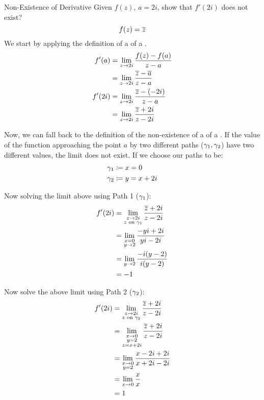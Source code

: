 \begin{example}[Lecture 5]{Non-Existence of Derivative}
  Given $f(z)$, $a = 2i$, show that $f'(2i)$ does not exist?
  \begin{equation*}
    f(z) = \overline{z}
  \end{equation*}
  \tcblower{}
  We start by applying the definition of a  of a .
  \begin{align*}
    f'(a) &= \lim\limits_{z \to 2i} \frac{f(z) - f(a)}{z - a} \\
          &= \lim\limits_{z \to 2i} \frac{\overline{z} - \overline{a}}{z - a} \\
    f'(2i) &= \lim\limits_{z \to 2i} \frac{\overline{z} - (-2i)}{z - a} \\
          &= \lim\limits_{z \to 2i} \frac{\overline{z} + 2i}{z - 2i} \\
  \end{align*}

  Now, we can fall back to the definition of the non-existence of a  of a .
  If the value of the function approaching the point $a$ by two different paths ($\gamma_{1}, \gamma_{2}$) have two different values, the limit does not exist.
  If we choose our paths to be:
  \begin{align*}
    \gamma_{1} &\coloneqq x = 0 \\
    \gamma_{2} &\coloneqq y = x + 2i
  \end{align*}

  Now solving the limit above using Path 1 ($\gamma_{1}$):
  \begin{align*}
    f'(2i) &= \lim\limits_{\substack{z \to 2i \\ z \text{ on } \gamma_{1}}} \frac{\overline{z} + 2i}{z - 2i} \\
           &= \lim\limits_{\substack{x = 0 \\ y \to 2}} \frac{-yi + 2i}{yi - 2i} \\
           &= \lim\limits_{y \to 2} \frac{-i (y-2)}{i (y-2)} \\
           &= -1
  \end{align*}

  Now solve the above limit using Path 2 ($\gamma_{2}$):
  \begin{align*}
    f'(2i) &= \lim\limits_{\substack{z \to 2i \\ z \text{ on } \gamma_{2}}} \frac{\overline{z} + 2i}{z - 2i} \\
           &= \lim\limits_{\substack{x \to 0 \\ y = 2 \\ z = x+2i}} \frac{\overline{z}+2i}{z-2i} \\
           &= \lim\limits_{\substack{x \to 0 \\ y = 2}} \frac{x-2i+2i}{x+2i-2i} \\
           &= \lim\limits_{\substack{x \to 0}} \frac{x}{x} \\
           &= 1
  \end{align*}


\end{example}
